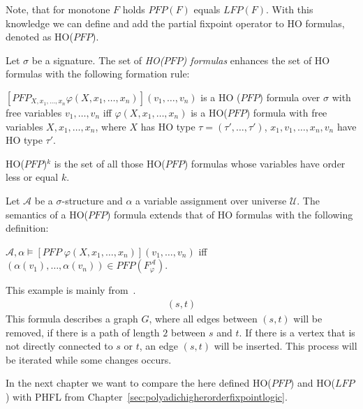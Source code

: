 Note, that for monotone $F$ holds $\mathit{PFP}(F)$ equals $\mathit{LFP}(F)$. With this knowledge we can define and
add the partial fixpoint operator to HO formulas, denoted as HO($\mathit{PFP}$).

\begin{definition}
    Let $\sigma$ be a signature. The set of \emph{HO($\mathit{PFP}$) formulas} enhances the set of HO formulas with the
    following formation rule:
    \begin{compactitem}
        \item $[\mathit{PFP}_{X, x_1, \dots, x_n}\varphi(X, x_1, \dots, x_n)](v_1, \dots, v_n)$ is a HO
        ($\mathit{PFP}$) formula over $\sigma$ with free variables $v_1, \dots, v_n$ iff $\varphi(X, x_1, \dots, x_n)
        $ is a HO($\mathit{PFP}$) formula with free variables $X, x_1, \dots, x_n$, where $X$ has HO type $\tau =
        (\tau', \dots, \tau')$, $x_1, v_1, \dots, x_n, v_n$ have HO type $\tau'$.
    \end{compactitem}
\end{definition}

HO($\mathit{PFP}$)$^k$ is the set of all those HO($\mathit{PFP}$) formulas whose variables have order less or equal $k$.

\begin{definition}
    Let $\mathcal{A}$ be a $\sigma$-structure and $\alpha$ a variable assignment over universe $\mathcal{U}$. The
    semantics of a HO($\mathit{PFP}$) formula extends that of HO formulas with the following definition:
    \begin{compactitem}
        \item $\mathcal{A}, \alpha \models [\mathit{PFP}\;\varphi(X, x_1, \dots, x_n)](v_1, \dots,
        v_n)$ iff $(\alpha(v_1), \dots, \alpha(v_n)) \in \mathit{PFP}(F_\varphi^\mathcal{A})$.
    \end{compactitem}
\end{definition}

\begin{example}
    This example is mainly from~\cite{abiteboul1995computing}.
    \begin{align*}
    [PFP\;(&G(x, y) \wedge \neg \exists z\colon\odot.\,(G(x, z) \wedge G(z, y)) \vee \\
    &\exists z\colon\odot.\,(\neg G(x, z)\wedge\neg G(z, x) \wedge \neg G(y, z) \wedge G(z, y)))](s, t)
    \end{align*}
    This formula describes a graph $G$, where all edges between $(s, t)$ will be removed, if there is a path of
    length $2$ between $s$ and $t$. If there is a vertex that is not directly connected to $s$ or $t$, an edge $(s,
    t)$ will be inserted. This process will be iterated while some changes occurs.

\end{example}

In the next chapter we want to compare the here defined HO($\mathit{PFP}$) and HO($\mathit{LFP}$) with PHFL from
Chapter~\ref{sec:polyadichigherorderfixpointlogic}.